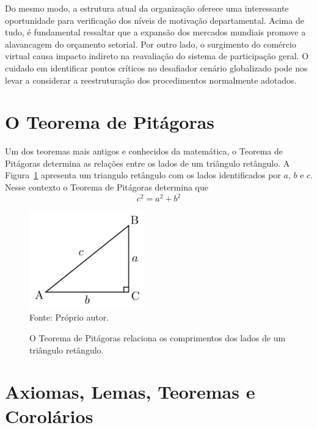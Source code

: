 \documentclass[fleqn]{profmat-cefet}
\begin{document}
Do mesmo modo, a estrutura atual da organização oferece uma interessante
oportunidade para verificação dos níveis de motivação departamental. Acima de
tudo, é fundamental ressaltar que a expansão dos mercados mundiais promove a
alavancagem do orçamento setorial. Por outro lado, o surgimento do comércio
virtual causa impacto indireto na reavaliação do sistema de participação geral.
O cuidado em identificar pontos críticos no desafiador cenário globalizado pode
nos levar a considerar a reestruturação dos procedimentos normalmente adotados. 

\section{O Teorema de Pitágoras}
\label{sec:o_teorema_de_pitagoras}

Um dos teoremas mais antigos e conhecidos da matemática, o Teorema de Pitágoras
determina as relações entre os lados de um triângulo retângulo. A
Figura~\ref{fig:pitagoras} apresenta um triangulo retângulo com os lados
identificados por $a$, $b$ e $c$. Nesse contexto o Teorema de Pitágoras 
determina que
\begin{equation}
    \label{equ:pitagoras}
    c^2 = a^2 + b^2
\end{equation}

\begin{figure}[hbt]
    \centering
    \caption[Teorema de Pitágoras]
            {O Teorema de Pitágoras relaciona os comprimentos dos lados de um triângulo retângulo.}
    \label{fig:pitagoras}
    \includegraphics[width=50mm]{figs/pitagoras} 
    \\ Fonte: Próprio autor.
\end{figure}

\section{Axiomas, Lemas, Teoremas e Corolários}
\label{sec:axiomas_lemas_teoremas_e_corolarios}
\end{document}
